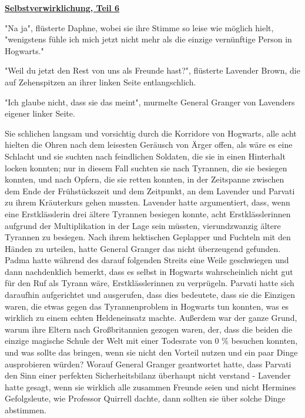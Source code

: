 

\hypertarget{selbstverwirklichung-teil-6}{%

\textbf{\uline{Selbstverwirklichung, Teil 6}}

"Na ja", flüsterte Daphne, wobei sie ihre Stimme so leise wie möglich hielt, "wenigstens fühle ich mich jetzt nicht mehr als die einzige vernünftige Person in Hogwarts."

"Weil du jetzt den Rest von uns als Freunde hast?", flüsterte Lavender Brown, die auf Zehenspitzen an ihrer linken Seite entlangschlich.

"Ich glaube nicht, dass sie das meint", murmelte General Granger von Lavenders eigener linker Seite.

Sie schlichen langsam und vorsichtig durch die Korridore von Hogwarts, alle acht hielten die Ohren nach dem leisesten Geräusch von Ärger offen, als wäre es eine Schlacht und sie suchten nach feindlichen Soldaten, die sie in einen Hinterhalt locken konnten; nur in diesem Fall suchten sie nach Tyrannen, die sie besiegen konnten, und nach Opfern, die sie retten konnten, in der Zeitspanne zwischen dem Ende der Frühstückszeit und dem Zeitpunkt, an dem Lavender und Parvati zu ihrem Kräuterkurs gehen mussten. Lavender hatte argumentiert, dass, wenn eine Erstklässlerin drei ältere Tyrannen besiegen konnte, acht Erstklässlerinnen aufgrund der Multiplikation in der Lage sein müssten, vierundzwanzig ältere Tyrannen zu besiegen. Nach ihrem hektischen Geplapper und Fuchteln mit den Händen zu urteilen, hatte General Granger das nicht überzeugend gefunden. Padma hatte während des darauf folgenden Streits eine Weile geschwiegen und dann nachdenklich bemerkt, dass es selbst in Hogwarts wahrscheinlich nicht gut für den Ruf als Tyrann wäre, Erstklässlerinnen zu verprügeln. Parvati hatte sich daraufhin aufgerichtet und ausgerufen, dass dies bedeutete, dass sie die Einzigen waren, die etwas gegen das Tyrannenproblem in Hogwarts tun konnten, was es wirklich zu einem echten Heldeneinsatz machte. Außerdem war der ganze Grund, warum ihre Eltern nach Großbritannien gezogen waren, der, dass die beiden die einzige magische Schule der Welt mit einer Todesrate von 0 \% besuchen konnten, und was sollte das bringen, wenn sie nicht den Vorteil nutzen und ein paar Dinge ausprobieren würden? Worauf General Granger geantwortet hatte, dass Parvati den Sinn einer perfekten Sicherheitsbilanz überhaupt nicht verstand - Lavender hatte gesagt, wenn sie wirklich alle zusammen Freunde seien und nicht Hermines Gefolgsleute, wie Professor Quirrell dachte, dann sollten sie über solche Dinge abstimmen.

}
